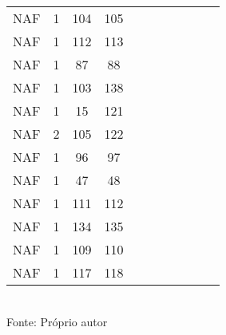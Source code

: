 \begin{table}[H]
{\begin{tabular}{ccccccccccc}
NAF & 1 & 104 & 105 &  &  &  &  &  &  &  \\
NAF & 1 & 112 & 113 &  &  &  &  &  &  &  \\
NAF & 1 & 87 & 88 &  &  &  &  &  &  &  \\
NAF & 1 & 103 & 138 &  &  &  &  &  &  &  \\
NAF & 1 & 15 & 121 &  &  &  &  &  &  &  \\
NAF & 2 & 105 & 122 &  &  &  &  &  &  &  \\
NAF & 1 & 96 & 97 &  &  &  &  &  &  &  \\
NAF & 1 & 47 & 48 &  &  &  &  &  &  &  \\
NAF & 1 & 111 & 112 &  &  &  &  &  &  &  \\
NAF & 1 & 134 & 135 &  &  &  &  &  &  &  \\
NAF & 1 & 109 & 110 &  &  &  &  &  &  &  \\
NAF & 1 & 117 & 118 &  &  &  &  &  &  &  \\
\bottomrule
\end{tabular}}
\\Fonte: Próprio autor
\end{table}


